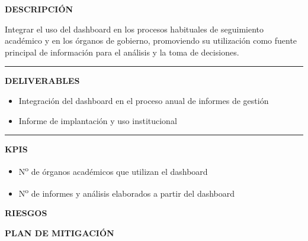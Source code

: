 \documentclass[11pt,a4paper]{scrreprt}
\newcommand{\fieldlabel}[1]{%
  {\footnotesize\sffamily\bfseries\color{mutedcolor}\MakeUppercase{#1}}\par\nopagebreak[4]
}
\newcommand{\fieldsep}{\vspace{3pt}\noindent\textcolor{bordercolor}{\rule{\linewidth}{0.4pt}}\vspace{3pt}\par}
\begin{document}
\begin{tcolorbox}[pabox={dashcolor}{PA5.2 \enspace\textbullet\enspace Implantación y uso institucional del dashboard en los procesos de gestión}]

\fieldlabel{Descripci\'on}
{\small Integrar el uso del dashboard en los procesos habituales de seguimiento académico y en los órganos de gobierno, promoviendo su utilización como fuente principal de información para el análisis y la toma de decisiones.}\par
\fieldsep
\fieldlabel{Deliverables}
{\small \begin{itemize}[noitemsep,topsep=2pt]
\item Integración del dashboard en el proceso anual de informes de gestión
\item Informe de implantación y uso institucional
\end{itemize}}\par
\fieldsep
\fieldlabel{KPIs}
{\small \begin{itemize}[noitemsep,topsep=2pt]
\item N\textsuperscript{o} de órganos académicos que utilizan el dashboard
\item N\textsuperscript{o} de informes y análisis elaborados a partir del dashboard
\end{itemize}}\par
\end{tcolorbox}
\begin{tcolorbox}[riskbox]
{\footnotesize\sffamily\bfseries\color{red!50!black} RIESGOS}\par{}
\end{tcolorbox}
\begin{tcolorbox}[mitbox]
{\footnotesize\sffamily\bfseries\color{green!40!black} PLAN DE MITIGACI\'ON}\par{}
\end{tcolorbox}
\vspace{8pt}
\end{document}
